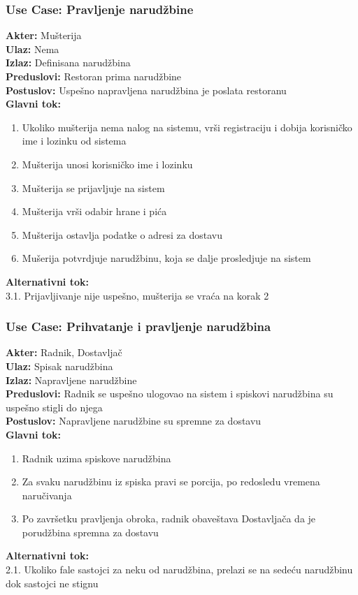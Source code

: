 \documentclass{article}
\begin{document}
\subsubsection{\textbf{Use Case}: Pravljenje narudžbine}
\textbf{Akter:} Mušterija\\
\textbf{Ulaz:} Nema\\
\textbf{Izlaz:} Definisana narudžbina\\
\textbf{Preduslovi:} Restoran prima narudžbine\\
\textbf{Postuslov:} Uspešno napravljena narudžbina je poslata restoranu\\
\textbf{Glavni tok:}
\begin{enumerate}
\item Ukoliko mušterija nema nalog na sistemu, vrši registraciju i dobija korisničko ime i lozinku od sistema
\item Mušterija unosi korisničko ime i lozinku
\item Mušterija se prijavljuje na sistem
\item Mušterija vrši odabir hrane i pića
\item Mušterija ostavlja podatke o adresi za dostavu
\item Mušerija potvrdjuje narudžbinu, koja se dalje prosledjuje na sistem
\end{enumerate}
\textbf{Alternativni tok:} \\
        3.1. Prijavljivanje nije uspešno, mušterija se vraća na korak 2\\


\subsubsection{\textbf{Use Case}: Prihvatanje i pravljenje narudžbina}
\textbf{Akter:} Radnik, Dostavljač\\
\textbf{Ulaz:} Spisak narudžbina\\
\textbf{Izlaz:} Napravljene narudžbine\\
\textbf{Preduslovi:} Radnik se uspešno ulogovao na sistem i spiskovi narudžbina su uspešno stigli do njega\\
\textbf{Postuslov:}  Napravljene narudžbine su spremne za dostavu\\
\textbf{Glavni tok:}
\begin{enumerate}
\item Radnik uzima spiskove narudžbina
\item Za svaku narudžbinu iz spiska pravi se porcija, po redosledu vremena naručivanja
\item Po završetku pravljenja obroka, radnik obaveštava Dostavljača da je porudžbina spremna za dostavu 
\end{enumerate}
\textbf{Alternativni tok:}\\
       2.1. Ukoliko  fale sastojci za neku od narudžbina, prelazi se na sedeću narudžbinu dok sastojci ne stignu\\
       
\end{document}
